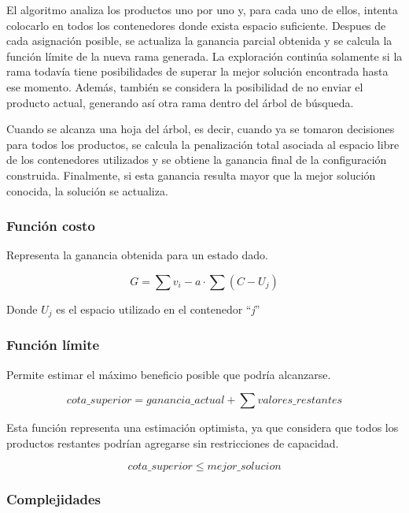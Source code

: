 \documentclass[12pt]{article}
\begin{document}
            El algoritmo analiza los productos uno por uno y, para cada uno de ellos, intenta colocarlo en todos los contenedores donde exista espacio suficiente. Despues de cada asignación posible, se actualiza la ganancia parcial obtenida y se calcula la función límite de la nueva rama generada. La exploración continúa solamente si la rama todavía tiene posibilidades de superar la mejor solución encontrada hasta ese momento. Además, también se considera la posibilidad de no enviar el producto actual, generando así otra rama dentro del árbol de búsqueda.

            Cuando se alcanza una hoja del árbol, es decir, cuando ya se tomaron decisiones para todos los productos, se calcula la penalización total asociada al espacio libre de los contenedores utilizados y se obtiene la ganancia final de la configuración construida. Finalmente, si esta ganancia resulta mayor que la mejor solución conocida, la solución se actualiza.

        \subsubsection{Función costo}

            Representa la ganancia obtenida para un estado dado.

            \[
            G = \sum v_i - a \cdot \sum (C - U_j)
            \]

            Donde $U_j$ es el espacio utilizado en el contenedor ``\textit{j}''

        \subsubsection{Función límite}

            Permite estimar el máximo beneficio posible que podría alcanzarse.


            \[
            cota\_superior = ganancia\_actual + \sum valores\_restantes
            \]

            Esta función representa una estimación optimista, ya que considera que todos los productos restantes podrían agregarse sin restricciones de capacidad.


            \[
            cota\_superior \leq mejor\_solucion
            \]

        \subsubsection{Complejidades}
\end{document}
